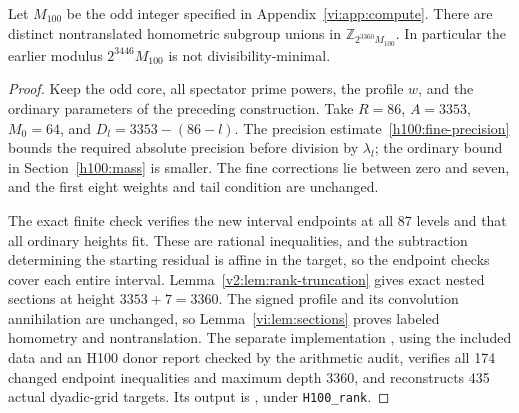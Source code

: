 \begin{corollary}
\label{v2:cor:h100-height}
Let $M_{100}$ be the odd integer specified in Appendix~\ref{vi:app:compute}. There are distinct nontranslated homometric subgroup unions in
$\mathbb Z_{2^{3360}M_{100}}$. In particular the earlier modulus
$2^{3446}M_{100}$ is not divisibility-minimal.
\end{corollary}
\begin{proof}
Keep the odd core, all spectator prime powers, the profile $w$, and the ordinary parameters of the preceding construction. Take $R=86$, $A=3353$, $M_0=64$, and $D_l=3353-(86-l)$. The precision estimate~\eqref{h100:fine-precision} bounds the required absolute precision before division by $\lambda_l$; the ordinary bound in Section~\ref{h100:mass} is smaller. The fine corrections lie between zero and seven, and the first eight weights and tail condition are unchanged.

The exact finite check  verifies the new interval endpoints at all 87 levels and that all ordinary heights fit. These are rational inequalities, and the subtraction determining the starting residual is affine in the target, so the endpoint checks cover each entire interval. Lemma~\ref{v2:lem:rank-truncation} gives exact nested sections at height $3353+7=3360$. The signed profile and its convolution annihilation are unchanged, so Lemma~\ref{vi:lem:sections} proves labeled homometry and nontranslation. The separate implementation , using the included data and an H100 donor report checked by the arithmetic audit, verifies all 174 changed endpoint inequalities and maximum depth 3360, and reconstructs 435 actual dyadic-grid targets. Its output is , under \texttt{H100\_rank}.
\end{proof}

